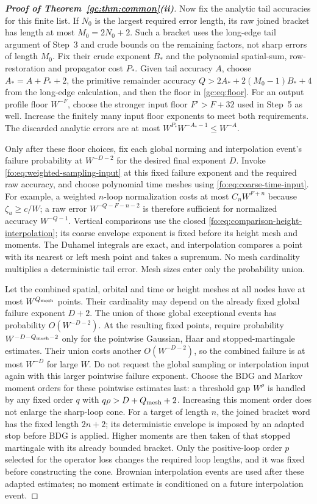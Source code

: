 \documentclass[11pt]{article}
\numberwithin{equation}{section}
\theoremstyle{remark}
\begin{document}
\begin{proof}[\textbf{Proof of Theorem~\ref{gc:thm:common}(ii)}]
Now fix the analytic tail accuracies for this finite list. If $N_0$
is the largest required error length, its raw joined bracket has length
at most $M_0=2N_0+2$. Such a bracket uses the long-edge tail argument
of Step~3 and crude bounds on the remaining factors, not sharp errors
of length $M_0$. Fix their crude exponent $B_*$ and the polynomial
spatial-sum, row-restoration and propagator cost $P_*$. Given tail
accuracy $A$, choose $A_*=A+P_*+2$, the primitive remainder accuracy
$Q>2A_*+2(M_0-1)B_*+4$ from the long-edge calculation, and then the floor in \eqref{gc:eq:floor}.
For an output profile floor $W^{-F}$, choose the stronger input floor
$F'>F+32$ used in Step~5 as well. Increase the finitely many input
floor exponents to meet both requirements.
The discarded analytic errors are at most
$W^{P_*}W^{-A_*-1}\le W^{-A}$.

Only after these floor choices, fix each global norming and
interpolation event's failure probability at $W^{-D-2}$ for the desired
final exponent $D$. Invoke \eqref{fo:eq:weighted-sampling-input} at
this fixed failure exponent and the required raw accuracy, and choose
polynomial time meshes using \eqref{fo:eq:coarse-time-input}. For example, a weighted $n$-loop
normalization costs at most $C_nW^{F+n}$ because $\zeta_u\ge c/W$;
a raw error $W^{-Q-F-n-2}$ is therefore sufficient for normalized
accuracy $W^{-Q-1}$. Vertical comparisons use the closed
\eqref{fo:eq:comparison-height-interpolation}; its coarse envelope
exponent is fixed before its height mesh and moments. The Duhamel
integrals are exact, and interpolation compares a point with its
nearest or left mesh point and takes a supremum. No mesh cardinality
multiplies a deterministic tail error. Mesh sizes enter only the
probability union.

Let the combined spatial, orbital and time or height meshes at all
nodes have at most $W^{Q_{\rm mesh}}$ points. Their cardinality may
depend on the already fixed global failure exponent $D+2$.
The union of those global exceptional events has probability
$O(W^{-D-2})$. At the resulting fixed points, require probability
$W^{-D-Q_{\rm mesh}-2}$ only for the pointwise Gaussian, Haar and
stopped-martingale estimates. Their union costs another $O(W^{-D-2})$,
so the combined failure is at most $W^{-D}$ for large $W$.
Do not request the global sampling or interpolation input again with
this larger pointwise failure exponent. Choose the BDG and Markov
moment orders for these pointwise estimates last: a threshold gap
$W^\rho$ is handled by any fixed order $q$ with
$q\rho>D+Q_{\rm mesh}+2$.
Increasing this moment order does not enlarge the sharp-loop cone.
For a target of length $n$, the joined bracket word has the fixed
length $2n+2$; its deterministic envelope is imposed by an adapted
stop before BDG is applied. Higher moments are then taken of that
stopped martingale with its already bounded bracket.
Only the positive-loop order $p$ selected for the operator loss changes
the required loop lengths, and it was fixed before constructing the cone.
Brownian interpolation events are used after these adapted estimates;
no moment estimate is conditioned on a future interpolation event.


\end{proof}
\end{document}
